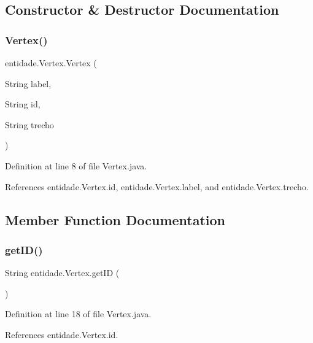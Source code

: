 \subsection{Constructor \& Destructor Documentation}
\hypertarget{classentidade_1_1Vertex_aefdd380ec5284dedc3d0e6b9d23a535a}{}\label{classentidade_1_1Vertex_aefdd380ec5284dedc3d0e6b9d23a535a} 
\subsubsection{\texorpdfstring{Vertex()}{Vertex()}}
{\footnotesize\ttfamily entidade.\+Vertex.\+Vertex (\begin{DoxyParamCaption}\item[{String}]{label,  }\item[{String}]{id,  }\item[{String}]{trecho }\end{DoxyParamCaption})}



Definition at line 8 of file Vertex.\+java.



References entidade.\+Vertex.\+id, entidade.\+Vertex.\+label, and entidade.\+Vertex.\+trecho.



\subsection{Member Function Documentation}
\hypertarget{classentidade_1_1Vertex_adab44db0925eba2da27edc6f9670f2b5}{}\label{classentidade_1_1Vertex_adab44db0925eba2da27edc6f9670f2b5} 
\subsubsection{\texorpdfstring{get\+I\+D()}{getID()}}
{\footnotesize\ttfamily String entidade.\+Vertex.\+get\+ID (\begin{DoxyParamCaption}{ }\end{DoxyParamCaption})}



Definition at line 18 of file Vertex.\+java.



References entidade.\+Vertex.\+id.


